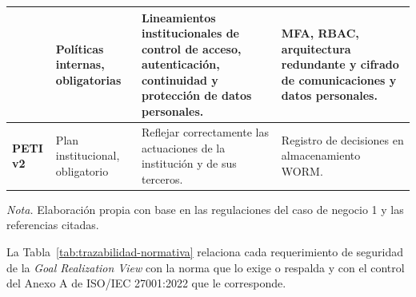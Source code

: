 \begin{table}[H]
\begin{tabularx}{\textwidth}{@{}>{\raggedright\arraybackslash}p{} Y Y Y@{}}
		& Políticas internas, obligatorias
		& Lineamientos institucionales de control de acceso, autenticación, continuidad y protección de datos personales.
		& MFA, RBAC, arquitectura redundante y cifrado de comunicaciones y datos personales.
		\\
		\midrule
		\textbf{PETI v2} \parencite{transmilenio2020peti}
		& Plan institucional, obligatorio
		& Reflejar correctamente las actuaciones de la institución y de sus terceros.
		& Registro de decisiones en almacenamiento WORM.
		\\
		\bottomrule
	\end{tabularx}

	\vspace{0.4em}
	\parbox{\textwidth}{\footnotesize \textit{Nota.} Elaboración propia con base en las regulaciones del caso de negocio 1 y las referencias citadas.}
\end{table}

La Tabla~\ref{tab:trazabilidad-normativa} relaciona cada requerimiento de seguridad de la \textit{Goal Realization View} con la norma que lo exige o respalda y con el control del Anexo A de ISO/IEC 27001:2022 que le corresponde.

